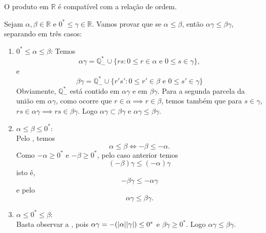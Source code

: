 \documentclass[../main.tex]{subfiles}
\begin{document}
\begin{teo}\label{reais-teo-multCompativelOrdem}
    O produto em $\mathbb{R}$ é compatível com a relação de ordem.
\end{teo}
\begin{dem}
    Sejam $\alpha, \beta \in \mathbb{R}$ e $0^* \leq \gamma \in \mathbb{R}$. Vamos provar que se $\alpha \leq \beta$, então $\alpha \gamma \leq \beta \gamma$, separando em três casos:
    \begin{enumerate}
        \item $0^* \leq \alpha \leq \beta$:
            Temos 
            \[ \alpha\gamma = \mathbb{Q}_{-}^* \cup \{ rs : 0 \leq r \in \alpha \text{ e } 0 \leq s \in \gamma \}, \]
            e
            \[ \beta\gamma = \mathbb{Q}_{-}^* \cup \{ r's' : 0 \leq r' \in \beta \text{ e } 0 \leq s' \in \gamma \} \]
            Obviamente, $\mathbb{Q}_{-}^* $ está contido em $\alpha\gamma$ e em $\beta\gamma$. Para a segunda parcela da união em $\alpha\gamma$, como ocorre que $r \in \alpha \implies r \in \beta$, temos também que para $s \in \gamma$, $rs \in \alpha\gamma \implies rs \in \beta\gamma$. Logo $\alpha\gamma \subset \beta\gamma$ e $\alpha\gamma \leq \beta\gamma$.

        \item $\alpha \leq \beta \leq 0^*$: \\
            
            Pelo , temos 
            \[ \alpha \leq \beta \iff - \beta \leq - \alpha. \]
            Como $-\alpha \geq 0^*$ e $-\beta \geq 0^*$, pelo caso anterior temos 
            \[ (-\beta)\gamma \leq (-\alpha)\gamma \]
            isto é, 
            \[ -\beta\gamma \leq -\alpha\gamma \]
            e  pelo  
            \[ \alpha\gamma \leq \beta\gamma. \]
            

        \item $\alpha \leq 0^* \leq \beta$: \\
            Basta observar a , pois $\alpha\gamma = -(\abs{\alpha}\abs{\gamma}) \leq 0^*$ e $\beta\gamma \geq 0^*$. Logo $\alpha\gamma \leq \beta\gamma.$
    \end{enumerate}
\end{dem}
\end{document}
